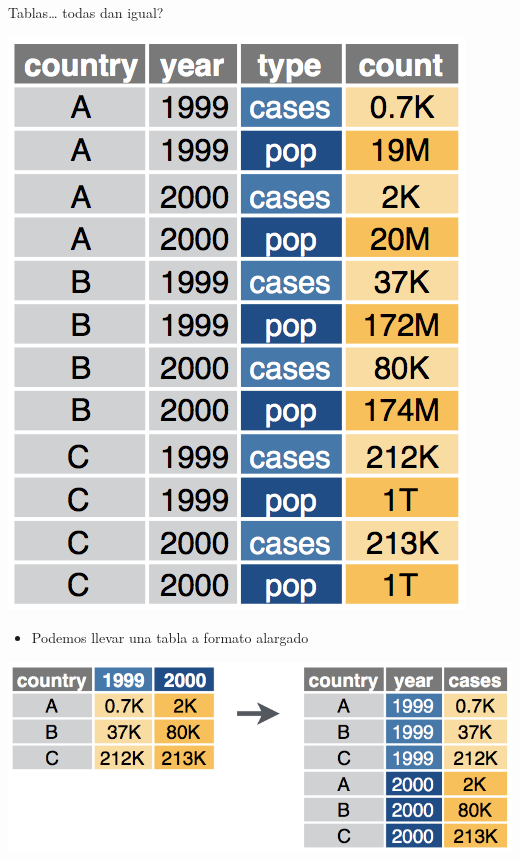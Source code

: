 \documentclass[ignorenonframetext,]{beamer}
\providecommand{\tightlist}{%
  \setlength{\itemsep}{0pt}\setlength{\parskip}{0pt}}
\begin{document}
\begin{frame}{Tablas\ldots{} todas dan igual?}
\protect\hypertarget{tablas-todas-dan-igual-1}{}

\begin{center}\includegraphics[width=0.55\linewidth]{data_long} \end{center}

\end{frame}

\begin{frame}{}
\protect\hypertarget{section-5}{}


\begin{itemize}
\tightlist
\item
  Podemos llevar una tabla a formato alargado
\end{itemize}

\begin{flushright}\includegraphics{pivot_longer_detailed} \end{flushright}

\end{frame}
\end{document}
